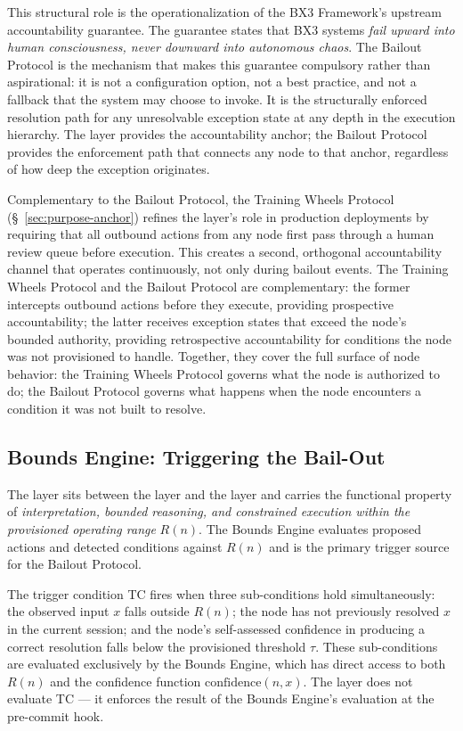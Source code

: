 This structural role is the operationalization of the BX3 Framework's upstream accountability guarantee. The guarantee states that BX3 systems \emph{fail upward into human consciousness, never downward into autonomous chaos}. The Bailout Protocol is the mechanism that makes this guarantee compulsory rather than aspirational: it is not a configuration option, not a best practice, and not a fallback that the system may choose to invoke. It is the structurally enforced resolution path for any unresolvable exception state at any depth in the execution hierarchy. The \purpose{} layer provides the accountability anchor; the Bailout Protocol provides the enforcement path that connects any node to that anchor, regardless of how deep the exception originates.

Complementary to the Bailout Protocol, the Training Wheels Protocol (\S~\ref{sec:purpose-anchor}) refines the \purpose{} layer's role in production deployments by requiring that all outbound actions from any node first pass through a human review queue before execution. This creates a second, orthogonal accountability channel that operates continuously, not only during bailout events. The Training Wheels Protocol and the Bailout Protocol are complementary: the former intercepts outbound actions before they execute, providing prospective accountability; the latter receives exception states that exceed the node's bounded authority, providing retrospective accountability for conditions the node was not provisioned to handle. Together, they cover the full surface of node behavior: the Training Wheels Protocol governs what the node is authorized to do; the Bailout Protocol governs what happens when the node encounters a condition it was not built to resolve.

\subsection{Bounds Engine: Triggering the Bail-Out}
\label{sec:bounds-engine-trigger}

The \bounds{} layer sits between the \purpose{} layer and the \fact{} layer and carries the functional property of \emph{interpretation, bounded reasoning, and constrained execution within the provisioned operating range} $R(n)$. The Bounds Engine evaluates proposed actions and detected conditions against $R(n)$ and is the primary trigger source for the Bailout Protocol.

The trigger condition TC fires when three sub-conditions hold simultaneously: the observed input $x$ falls outside $R(n)$; the node has not previously resolved $x$ in the current session; and the node's self-assessed confidence in producing a correct resolution falls below the provisioned threshold $\tau$. These sub-conditions are evaluated exclusively by the Bounds Engine, which has direct access to both $R(n)$ and the confidence function $\text{confidence}(n, x)$. The \fact{} layer does not evaluate TC --- it enforces the result of the Bounds Engine's evaluation at the pre-commit hook.

